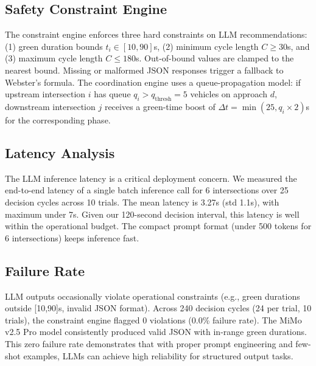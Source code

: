 \documentclass[conference]{IEEEtran}
\begin{document}
\subsection{Safety Constraint Engine}
The constraint engine enforces three hard constraints on LLM recommendations: (1) green duration bounds $t_i \in [10, 90]$s, (2) minimum cycle length $C \geq 30$s, and (3) maximum cycle length $C \leq 180$s. Out-of-bound values are clamped to the nearest bound. Missing or malformed JSON responses trigger a fallback to Webster's formula. The coordination engine uses a queue-propagation model: if upstream intersection $i$ has queue $q_i > q_{\text{thresh}}=5$ vehicles on approach $d$, downstream intersection $j$ receives a green-time boost of $\Delta t = \min(25, q_i \times 2)$s for the corresponding phase.

\subsection{Latency Analysis}
The LLM inference latency is a critical deployment concern. We measured the end-to-end latency of a single batch inference call for 6 intersections over 25 decision cycles across 10 trials. The mean latency is 3.27s (std 1.1s), with maximum under 7s. Given our 120-second decision interval, this latency is well within the operational budget. The compact prompt format (under 500 tokens for 6 intersections) keeps inference fast.

\subsection{Failure Rate}
LLM outputs occasionally violate operational constraints (e.g., green durations outside [10,90]s, invalid JSON format). Across 240 decision cycles (24 per trial, 10 trials), the constraint engine flagged 0 violations (0.0\% failure rate). The MiMo v2.5 Pro model consistently produced valid JSON with in-range green durations. This zero failure rate demonstrates that with proper prompt engineering and few-shot examples, LLMs can achieve high reliability for structured output tasks.
\end{document}
